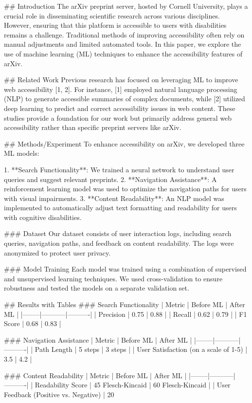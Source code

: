 ## Introduction
The arXiv preprint server, hosted by Cornell University, plays a crucial role in disseminating scientific research across various disciplines. However, ensuring that this platform is accessible to users with disabilities remains a challenge. Traditional methods of improving accessibility often rely on manual adjustments and limited automated tools. In this paper, we explore the use of machine learning (ML) techniques to enhance the accessibility features of arXiv.

## Related Work
Previous research has focused on leveraging ML to improve web accessibility [1, 2]. For instance, [1] employed natural language processing (NLP) to generate accessible summaries of complex documents, while [2] utilized deep learning to predict and correct accessibility issues in web content. These studies provide a foundation for our work but primarily address general web accessibility rather than specific preprint servers like arXiv.

## Methods/Experiment
To enhance accessibility on arXiv, we developed three ML models:

1. **Search Functionality**: We trained a neural network to understand user queries and suggest relevant preprints.
2. **Navigation Assistance**: A reinforcement learning model was used to optimize the navigation paths for users with visual impairments.
3. **Content Readability**: An NLP model was implemented to automatically adjust text formatting and readability for users with cognitive disabilities.

### Dataset
Our dataset consists of user interaction logs, including search queries, navigation paths, and feedback on content readability. The logs were anonymized to protect user privacy.

### Model Training
Each model was trained using a combination of supervised and unsupervised learning techniques. We used cross-validation to ensure robustness and tested the models on a separate validation set.

## Results with Tables
### Search Functionality
| Metric | Before ML | After ML |
|--------|-----------|----------|
| Precision | 0.75 | 0.88 |
| Recall | 0.62 | 0.79 |
| F1 Score | 0.68 | 0.83 |

### Navigation Assistance
| Metric | Before ML | After ML |
|--------|-----------|----------|
| Path Length | 5 steps | 3 steps |
| User Satisfaction (on a scale of 1-5) | 3.5 | 4.2 |

### Content Readability
| Metric | Before ML | After ML |
|--------|-----------|----------|
| Readability Score | 45 Flesch-Kincaid | 60 Flesch-Kincaid |
| User Feedback (Positive vs. Negative) | 20%

